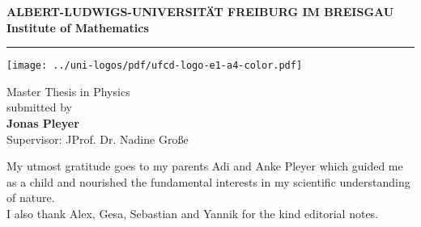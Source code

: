 \begin{titlepage}
\thispagestyle{empty}
\begin{center}
 
\Large\textbf{ALBERT-LUDWIGS-UNIVERSITÄT FREIBURG IM BREISGAU\\}
\vspace{0.5cm}
\Large\textbf{Institute of Mathematics}

\rule{\textwidth}{1pt}
\vspace{1.5cm}

\Large\textbf{\Title}

\vspace{1.5cm}

\texttt{[image: ../uni-logos/pdf/ufcd-logo-e1-a4-color.pdf]}

\vfill

\normalsize
Master Thesis in Physics\\
\vspace{0.5cm}
submitted \Date\hspace{0pt} by\\
\vspace{0.5cm}
\Large\textbf{Jonas Pleyer}\\
\normalsize
\vspace{0.5cm}
\large Supervisor: JProf. Dr. Nadine Große\\
\normalsize

\newpage
\thispagestyle{empty}
My utmost gratitude goes to my parents Adi and Anke Pleyer which guided me as a child and nourished the fundamental interests in my scientific understanding of nature.\\
\vfill
I also thank Alex, Gesa, Sebastian and Yannik for the kind editorial notes.

\end{center}

\newpage\null\thispagestyle{empty}\newpage
\end{titlepage}
\thispagestyle{empty}
